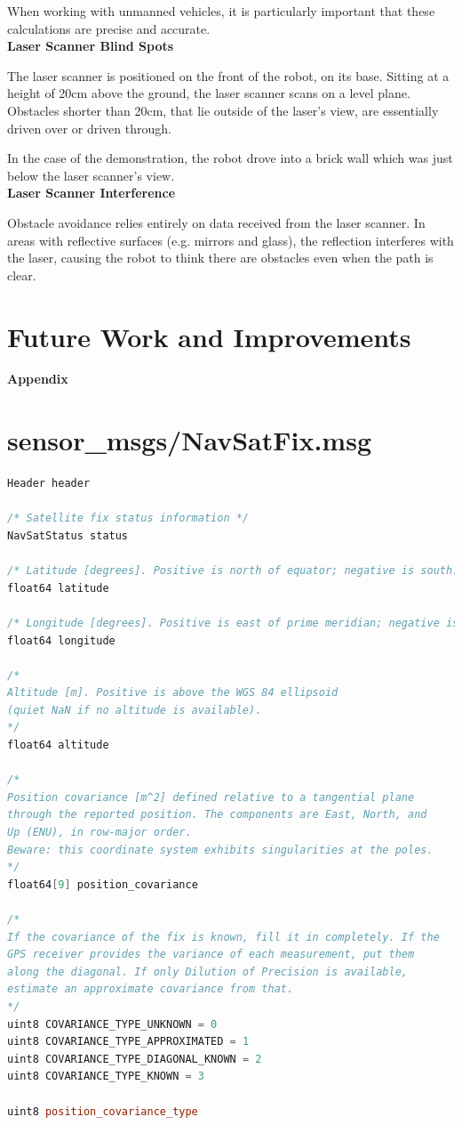 \documentclass[titlepage,12pt,a4paper]{article}
\begin{document}
When working with unmanned vehicles, it is particularly important that these calculations are precise and accurate. \\

\textbf{Laser Scanner Blind Spots}

The laser scanner is positioned on the front of the robot, on its base. Sitting at a height of 20cm above the ground, the laser scanner scans on a level plane. Obstacles shorter than 20cm, that lie outside of the laser's view, are essentially driven over or driven through. 

In the case of the demonstration, the robot drove into a brick wall which was just below the laser scanner's view. \\

\textbf{Laser Scanner Interference}

Obstacle avoidance relies entirely on data received from the laser scanner. In areas with reflective surfaces (e.g. mirrors and glass), the reflection interferes with the laser, causing the robot to think there are obstacles even when the path is clear.

\pagebreak
\section{Future Work and Improvements}


\pagebreak
{\huge \textbf{Appendix}}
\appendix
\addappheadtotoc
\section{sensor\_msgs/NavSatFix.msg}
\label{appendix:NavSatFix.msg}
\begin{lstlisting}[language=C++]
Header header

/* Satellite fix status information */
NavSatStatus status

/* Latitude [degrees]. Positive is north of equator; negative is south. */
float64 latitude

/* Longitude [degrees]. Positive is east of prime meridian; negative is west. */
float64 longitude

/*
Altitude [m]. Positive is above the WGS 84 ellipsoid
(quiet NaN if no altitude is available).
*/
float64 altitude

/*
Position covariance [m^2] defined relative to a tangential plane
through the reported position. The components are East, North, and
Up (ENU), in row-major order.
Beware: this coordinate system exhibits singularities at the poles.
*/
float64[9] position_covariance

/*
If the covariance of the fix is known, fill it in completely. If the
GPS receiver provides the variance of each measurement, put them
along the diagonal. If only Dilution of Precision is available,
estimate an approximate covariance from that.
*/
uint8 COVARIANCE_TYPE_UNKNOWN = 0
uint8 COVARIANCE_TYPE_APPROXIMATED = 1
uint8 COVARIANCE_TYPE_DIAGONAL_KNOWN = 2
uint8 COVARIANCE_TYPE_KNOWN = 3

uint8 position_covariance_type
\end{lstlisting}
\pagebreak
\end{document}
